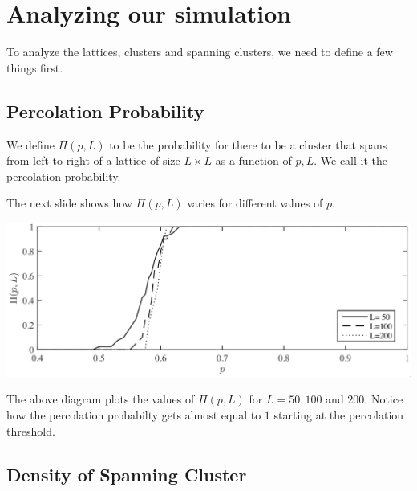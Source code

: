\documentclass[compress]{beamer}
\newcommand{\imp}[1]{\textcolor{NordRed}{#1}}
\begin{document}
\section{Analyzing our simulation}

\begin{frame}
    To analyze the lattices, clusters and spanning clusters, we need to define a few
    things first.
\end{frame}

\subsection{Percolation Probability}

\begin{frame}

    We define \imp{\(\Pi(p, L)\)} to be the probability for there to be a cluster that
    spans from left to right of a lattice of size \(L\times L\) as a function of \(p, L\).
    We call it the \imp{percolation probability}.

    \vspace{1em}

    The next slide shows how \(\Pi(p, L)\) varies for different values of \(p\).
\end{frame}


\begin{frame}
    \begin{center}
        \includegraphics[width=\linewidth]{pLvsp.png}
    \end{center}

    The above diagram plots the values of \(\Pi(p, L)\) for \(L = 50, 100\) and \(200\).
    Notice how the percolation probabilty gets almost equal to \(1\) starting at the
    percolation threshold. 
\end{frame}


\subsection{Density of Spanning Cluster}
\end{document}

